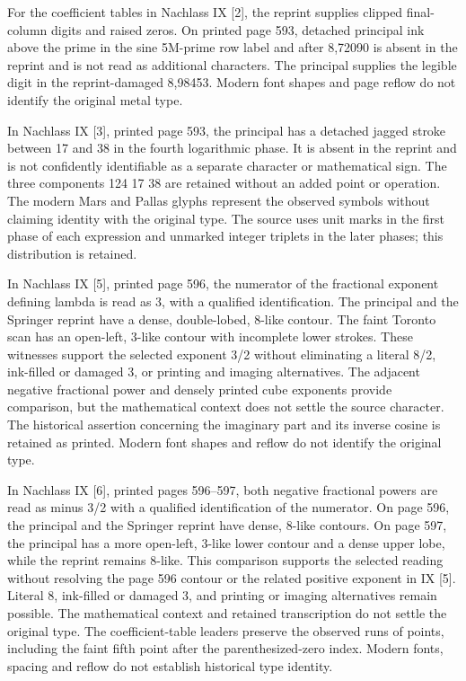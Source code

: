 For the coefficient tables in Nachlass IX [2], the reprint supplies clipped final-column digits and raised zeros. On printed page 593, detached principal ink above the prime in the sine 5M-prime row label and after 8,72090 is absent in the reprint and is not read as additional characters. The principal supplies the legible digit in the reprint-damaged 8,98453. Modern font shapes and page reflow do not identify the original metal type.

In Nachlass IX [3], printed page 593, the principal has a detached jagged stroke between 17 and 38 in the fourth logarithmic phase. It is absent in the reprint and is not confidently identifiable as a separate character or mathematical sign. The three components 124 17 38 are retained without an added point or operation. The modern Mars and Pallas glyphs represent the observed symbols without claiming identity with the original type. The source uses unit marks in the first phase of each expression and unmarked integer triplets in the later phases; this distribution is retained.

In Nachlass IX [5], printed page 596, the numerator of the fractional exponent defining lambda is read as 3, with a qualified identification. The principal and the Springer reprint have a dense, double-lobed, 8-like contour. The faint Toronto scan has an open-left, 3-like contour with incomplete lower strokes. These witnesses support the selected exponent 3/2 without eliminating a literal 8/2, ink-filled or damaged 3, or printing and imaging alternatives. The adjacent negative fractional power and densely printed cube exponents provide comparison, but the mathematical context does not settle the source character. The historical assertion concerning the imaginary part and its inverse cosine is retained as printed. Modern font shapes and reflow do not identify the original type.

In Nachlass IX [6], printed pages 596--597, both negative fractional powers are read as minus 3/2 with a qualified identification of the numerator. On page 596, the principal and the Springer reprint have dense, 8-like contours. On page 597, the principal has a more open-left, 3-like lower contour and a dense upper lobe, while the reprint remains 8-like. This comparison supports the selected reading without resolving the page 596 contour or the related positive exponent in IX [5]. Literal 8, ink-filled or damaged 3, and printing or imaging alternatives remain possible. The mathematical context and retained transcription do not settle the original type. The coefficient-table leaders preserve the observed runs of points, including the faint fifth point after the parenthesized-zero index. Modern fonts, spacing and reflow do not establish historical type identity.

